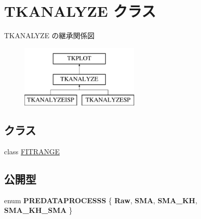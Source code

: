 \hypertarget{class_t_k_a_n_a_l_y_z_e}{}\section{T\+K\+A\+N\+A\+L\+Y\+ZE クラス}
\label{class_t_k_a_n_a_l_y_z_e}
T\+K\+A\+N\+A\+L\+Y\+ZE の継承関係図\begin{figure}[H]
\begin{center}
\leavevmode
\includegraphics[height=3.000000cm]{class_t_k_a_n_a_l_y_z_e}
\end{center}
\end{figure}
\subsection*{クラス}
\begin{DoxyCompactItemize}
\item 
class \hyperlink{class_t_k_a_n_a_l_y_z_e_1_1_f_i_t_r_a_n_g_e}{F\+I\+T\+R\+A\+N\+GE}
\end{DoxyCompactItemize}
\subsection*{公開型}
\begin{DoxyCompactItemize}
\item 
\mbox{\label{class_t_k_a_n_a_l_y_z_e_aaf7dd74ca27bd81681431db1e0bad011}} 
enum {\bfseries P\+R\+E\+D\+A\+T\+A\+P\+R\+O\+C\+E\+S\+SS} \{ {\bfseries Raw}, 
{\bfseries S\+MA}, 
{\bfseries S\+M\+A\+\_\+\+KH}, 
{\bfseries S\+M\+A\+\_\+\+K\+H\+\_\+\+S\+MA}
 \}
\end{DoxyCompactItemize}
